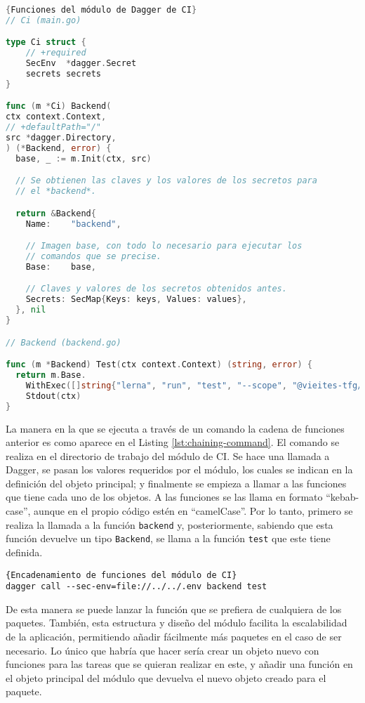 \begin{lstlisting}[language=go,label=lst:chaining-code]{Funciones del módulo de Dagger de CI}
// Ci (main.go)

type Ci struct {
	// +required
	SecEnv  *dagger.Secret
	secrets secrets
}

func (m *Ci) Backend(
ctx context.Context,
// +defaultPath="/"
src *dagger.Directory,
) (*Backend, error) {
  base, _ := m.Init(ctx, src)

  // Se obtienen las claves y los valores de los secretos para
  // el *backend*.

  return &Backend{
    Name:    "backend",

    // Imagen base, con todo lo necesario para ejecutar los
    // comandos que se precise.
    Base:    base,

    // Claves y valores de los secretos obtenidos antes.
    Secrets: SecMap{Keys: keys, Values: values},
  }, nil
}

// Backend (backend.go)

func (m *Backend) Test(ctx context.Context) (string, error) {
  return m.Base.
    WithExec([]string{"lerna", "run", "test", "--scope", "@vieites-tfg/zoo-backend"}).
    Stdout(ctx)
}

\end{lstlisting}

La manera en la que se ejecuta a través de un comando la cadena de funciones anterior es como aparece en el Listing \ref{lst:chaining-command}. El comando se realiza en el directorio de trabajo del módulo de CI. Se hace una llamada a Dagger, se pasan los valores requeridos por el módulo, los cuales se indican en la definición del objeto principal; y finalmente se empieza a llamar a las funciones que tiene cada uno de los objetos. A las funciones se las llama en formato ``kebab-case'', aunque en el propio código estén en ``camelCase''. Por lo tanto, primero se realiza la llamada a la función \texttt{backend} y, posteriormente, sabiendo que esta función devuelve un tipo \texttt{Backend}, se llama a la función \texttt{test} que este tiene definida.

\begin{lstlisting}[label=lst:chaining-command]{Encadenamiento de funciones del módulo de CI}
dagger call --sec-env=file://../../.env backend test
\end{lstlisting}

De esta manera se puede lanzar la función que se prefiera de cualquiera de los paquetes. También, esta estructura y diseño del módulo facilita la escalabilidad de la aplicación, permitiendo añadir fácilmente más paquetes en el caso de ser necesario. Lo único que habría que hacer sería crear un objeto nuevo con funciones para las tareas que se quieran realizar en este, y añadir una función en el objeto principal del módulo que devuelva el nuevo objeto creado para el paquete.


